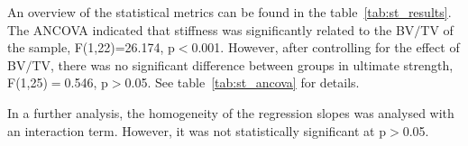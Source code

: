 \documentclass[12pt, a4paper, twoside]{report}
\begin{document}
%
\begin{table}[H]
\centering
{}
\caption{Results from the ANCOVA analysis, controlling for BV/TV.}
\label{tab:st_ancova}
\end{table}
%
An overview of the statistical metrics can be found in the table~\ref{tab:st_results}.
The ANCOVA indicated that stiffness was significantly related to the BV$/$TV of the sample, F(1,22)=26.174, p$<$0.001.
However, after controlling for the effect of BV$/$TV, there was no significant difference between groups in ultimate strength, F(1,25)$=$0.546, p$>$0.05.
See table~\ref{tab:st_ancova} for details.

In a further analysis, the homogeneity of the regression slopes was analysed with an interaction term.
However, it was not statistically significant at p$>$0.05.

%
%
%
\end{document}
